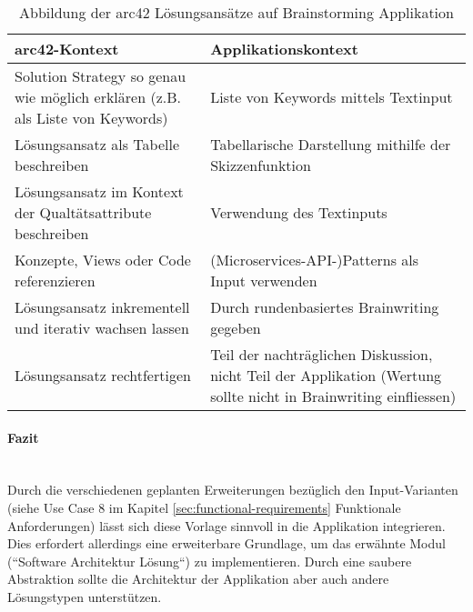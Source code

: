 \renewcommand{\arraystretch}{1.7}
\begin{table}[h]
	\centering
	\begin{tabular}{|p{6cm}|p{6cm}|}
		\hline
		\textbf{arc42-Kontext} & \textbf{Applikationskontext}\\
		\hline
		Solution Strategy so genau wie möglich erklären (z.B. als Liste von Keywords) & Liste von Keywords mittels Textinput \\
		\hline
		Lösungsansatz als Tabelle beschreiben & Tabellarische Darstellung mithilfe der Skizzenfunktion\\
		\hline
		Lösungsansatz im Kontext der Qualtätsattribute beschreiben & Verwendung des Textinputs\\
		\hline
		Konzepte, Views oder Code referenzieren & (Microservices-API-)Patterns\cite{microservices-api} als Input verwenden\\
		\hline
		Lösungsansatz inkrementell und iterativ wachsen lassen & Durch rundenbasiertes Brainwriting gegeben\\
		\hline
		Lösungsansatz rechtfertigen & Teil der nachträglichen Diskussion, nicht Teil der Applikation (Wertung sollte nicht in Brainwriting einfliessen)\\
		\hline
	\end{tabular}
	\caption{Abbildung der arc42 Lösungsansätze auf Brainstorming Applikation}
	\label{tab:arc42-mapping}
\end{table}
\paragraph{Fazit}~\\
Durch die verschiedenen geplanten Erweiterungen bezüglich den Input-Varianten (siehe Use Case 8 im Kapitel \ref{sec:functional-requirements} Funktionale Anforderungen) lässt sich diese Vorlage sinnvoll in die Applikation integrieren. Dies erfordert allerdings eine erweiterbare Grundlage, um das erwähnte Modul (``Software Architektur Lösung``) zu implementieren. Durch eine saubere Abstraktion sollte die Architektur der Applikation aber auch andere Lösungstypen unterstützen.